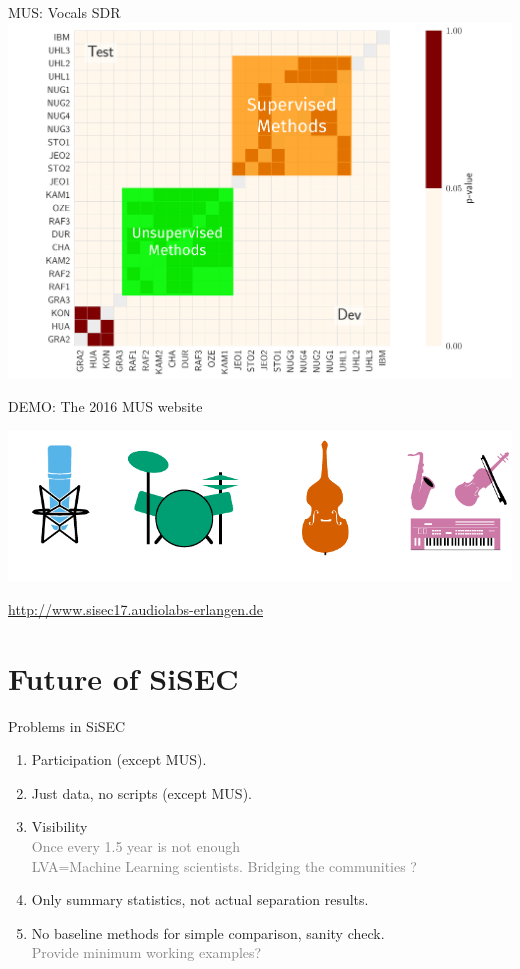\documentclass{beamer}
\begin{document}
\begin{frame}{MUS: Vocals SDR}
\includegraphics[width=\textwidth]{fig/wilcox_voc_sdr_slide_marked.pdf}
\end{frame}

\begin{frame}{DEMO: The 2016 MUS website}
\begin{center}
\includegraphics[width=\textwidth]{fig/mus-website.pdf}

\url{http://www.sisec17.audiolabs-erlangen.de}

\end{center}
\end{frame}

\section{Future of SiSEC}

\begin{frame}{Problems in SiSEC}

\begin{enumerate}
\def\labelenumi{\arabic{enumi}.}

\item
  Participation (except MUS).
\item
  Just data, no scripts (except MUS).
\item
  Visibility\\
  \textcolor{gray}{Once every 1.5 year is not enough\\LVA=Machine Learning scientists. Bridging the communities ?}
\item
  Only summary statistics, not actual separation results.
\item
  No baseline methods for simple comparison, sanity check.\\
  \textcolor{gray}{Provide minimum working examples?}
\end{enumerate}
\end{frame}
\end{document}
